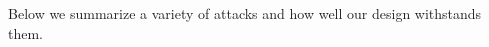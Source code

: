 \documentclass[times,10pt,twocolumn]{article}
\begin{document}
%



\label{sec:attacks}

Below we summarize a variety of attacks and how well our design withstands
them.
\end{document}
